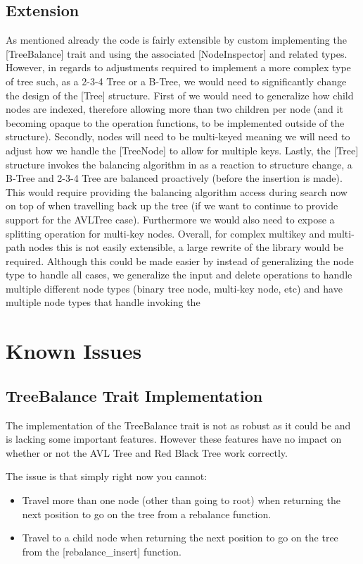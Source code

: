 \documentclass[11pt, letterpaper]{article}
\begin{document}
\subsection{Extension}
As mentioned already the code is fairly extensible by custom implementing the [TreeBalance] trait and using the associated
[NodeInspector] and related types.  However, in regards to adjustments required to implement a more complex type of tree such, as a 2-3-4 Tree or a B-Tree,
we would need to significantly change the design of the [Tree] structure.  First of we would need to generalize how child nodes are indexed, therefore allowing
more than two children per node (and it becoming opaque to the operation functions, to be implemented outside of the structure).
Secondly, nodes will need to be multi-keyed meaning we will need to adjust how we handle the [TreeNode] to allow for multiple keys.
Lastly, the [Tree] structure invokes the balancing algorithm in as a reaction to structure change, a B-Tree and 2-3-4 Tree are balanced
proactively (before the insertion is made).  This would require providing the balancing algorithm access during search now on top of when travelling back up the tree
(if we want to continue to provide support for the AVLTree case).  Furthermore we would also need to expose a splitting operation for multi-key nodes.
Overall, for complex multikey and multi-path nodes this is not easily extensible, a large rewrite of the library would be required.
Although this could be made easier by instead of generalizing the node type to handle all cases, we generalize the input and delete operations to handle
multiple different node types (binary tree node, multi-key node, etc) and have multiple node types that handle invoking the 

\section{Known Issues}

\subsection{TreeBalance Trait Implementation}
The implementation of the TreeBalance trait is not as robust as it could be and is lacking some important features.
However these features have no impact on whether or not the AVL Tree and Red Black Tree work correctly.

\noindent The issue is that simply right now you cannot:
\begin{itemize}
    \item Travel more than one node (other than going to root) when returning the next position to go on the tree from a rebalance function.
    \item Travel to a child node when returning the next position to go on the tree from the [rebalance\_insert] function.
\end{itemize}
\end{document}
